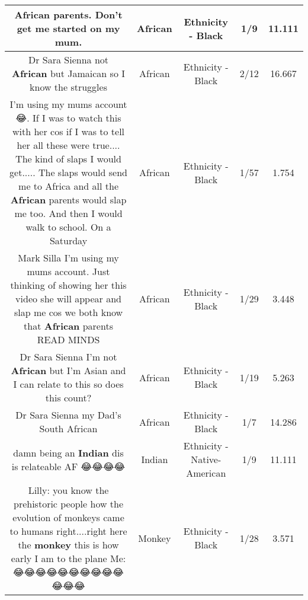 \documentclass[11pt]{article}
\newlength\mylength
\begin{document}
\begin{center}
\begin{longtable}{|C{.65\mylength}|C{.30\mylength}|C{.12\mylength}|C{.12\mylength}|C{.12\mylength}|}
  \small African parents. Don't get me started on my mum.\normalsize   & African & Ethnicity - Black & 1/9 & 11.111 \\  \hline
  \small Dr Sara Sienna not \textbf{African} but Jamaican so I know the struggles\normalsize   & African & Ethnicity - Black & 2/12 & 16.667 \\  \hline
  \small I'm using my mums account😂. If I was to watch this with her cos if I was to tell her all these were true.... The kind of slaps I would get..... The slaps would send me to Africa and all the \textbf{African} parents would slap me too. And then I would walk to school. On a Saturday\normalsize   & African & Ethnicity - Black & 1/57 & 1.754 \\  \hline
  \small Mark Silla I'm using my mums account. Just thinking of showing her this video she will appear and slap me cos we both know that \textbf{African} parents READ MINDS\normalsize   & African & Ethnicity - Black & 1/29 & 3.448 \\  \hline
  \small Dr Sara Sienna I'm not \textbf{African} but I'm Asian and I can relate to this so does this count?\normalsize   & African & Ethnicity - Black & 1/19 & 5.263 \\  \hline
  \small Dr Sara Sienna my Dad's South African\normalsize   & African & Ethnicity - Black & 1/7 & 14.286 \\  \hline
  \small damn being an \textbf{Indian} dis is relateable AF 😂😂😂😂\normalsize   & Indian & Ethnicity - Native-American & 1/9 & 11.111 \\  \hline
  \small Lilly: you know the prehistoric people how the evolution of monkeys came to humans right....right here the \textbf{monkey} this is how early I am to the plane Me:😂😂😂😂😂😂😂😂😂😂😂😂😂\normalsize   & Monkey & Ethnicity - Black & 1/28 & 3.571 \\  \hline

\end{longtable}
\end{center}
\end{document}
